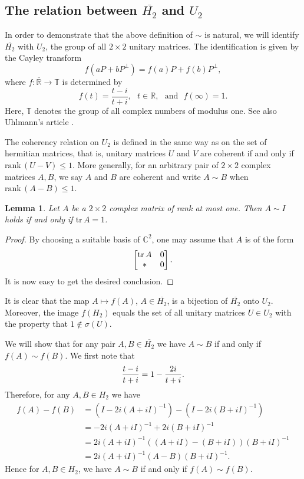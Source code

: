 \documentclass[10pt,a4paper]{amsart}
\providecommand{\index}[1]{}
\newcommand\oH{{\overline{H_2}}}
\newcommand\oR{{\overline{\mathbb{R}}}}
\newtheorem{lemma}[theorem]{Lemma}
\theoremstyle{definition}
\theoremstyle{remark}
\numberwithin{subsection}{section}
\numberwithin{equation}{section}
\begin{document}
\subsection{The relation between $\oH$ and $U_2$}\label{oHU2}
In order to demonstrate that the above definition of $\sim$ is natural, we will identify $\oH$ with $U_2$\index{$U_2$}, the group of all $2 \times 2$ unitary matrices. The identification is given by the Cayley transform \index{Cayley transform}
\begin{equation}\label{cayley}
f(aP+bP^{\perp}) = f(a)P+f(b)P^{\perp},
\end{equation}
 where $f\colon {\oR}\to\mathbb{T}$ is determined by 
\begin{equation}\label{cayleyf}
 f(t)=\frac{t-i}{t+i}, \ \ \ t\in \mathbb{R},\ \ \  \text{and}\ \ \ f(\infty)=1.
\end{equation}
Here, $\mathbb{T}$ \index{$T$@$\mathbb{T}$} denotes the group of all complex numbers of modulus one.
See also Uhlmann's article \cite{Uh}.

The coherency relation on $U_2$ is defined in the same way as on the set of hermitian matrices, that is, unitary matrices $U$ and $V$ are coherent if and only if $\mathrm{rank}\, (U-V) \le 1$. 
More generally, for an arbitrary pair of $2\times 2$ complex matrices $A, B$, we say $A$ and $B$ are coherent and write $A\sim B$ \index{$\sim$3@$\sim$ (for a pair of $2\times 2$ matrices)} when $\mathrm{rank}\, (A-B) \le 1$.

\begin{lemma}\label{tr1}
Let $A$ be a $2\times 2$ complex matrix of rank at most one.
Then $A\sim I$ holds if and only if $\mathrm{tr}\, A=1$. 
\end{lemma}
\begin{proof}
By choosing a suitable basis of $\mathbb{C}^2$, one may assume that $A$ is of the form
\[
\left[ \begin{matrix} \mathrm{tr}\,A  & 0  \cr * & 0 \cr \end{matrix} \right]. 
\]
It is now easy to get the desired conclusion.
\end{proof}
It is clear that the map $A \mapsto f(A)$, $A \in \oH$, is a bijection of $\oH$ onto $U_2$. 
Moreover, the image $f(H_2)$ equals 
the set of all unitary matrices $U \in U_2$ with the property that $1 \not\in \sigma (U)$.

We will show that for any pair $A,B \in \oH$ we have $A \sim B$ if and only if $f(A) \sim f(B)$. We first note that
\begin{equation}\label{mmmm}
{t-i \over t+i} = 1 - {2i \over t+i}.
\end{equation}
Therefore, for any  $A,B \in H_2$ we have
\[
\begin{split}
f(A) - f(B) &= \left( I - 2i(A+iI)^{-1} \right) -  \left( I-2i(B+iI)^{-1} \right)\\
&=-2i(A+iI)^{-1} + 2i(B+iI)^{-1} \\
&= 2i(A+iI)^{-1} ((A+iI)-(B+iI))(B+iI)^{-1}\\
&= 2i(A+iI)^{-1} (A-B) (B+iI)^{-1}.
\end{split}
\]
Hence for  $A,B \in H_2$, we have $A \sim B$ if and only if $f(A) \sim f(B)$. 
\end{document}
